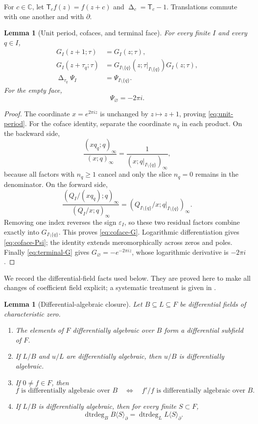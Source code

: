 \documentclass[11pt]{article}
\numberwithin{equation}{section}
\newtheorem{lemma}[theorem]{Lemma}
\theoremstyle{definition}
\theoremstyle{remark}
\newcommand{\C}{\mathbb C}
\newcommand{\dtrdeg}{\operatorname{dtrdeg}}
\newcommand{\T}{\mathsf T}
\newcommand{\Deltaop}{\mathop{\Delta}}
\begin{document}
For $c\in\C$, let $\T_cf(z)=f(z+c)$ and
$\Deltaop_c=\T_c-1$.  Translations commute with one another and with
$\partial$.

\begin{lemma}[Unit period, cofaces, and terminal face]
\label{lem:coface}
For every finite $I$ and every $q\in I$,
\begin{align}
 G_I(z+1;\tau)&=G_I(z;\tau),
 \label{eq:unit-period}\\
 G_I(z+\tau_q;\tau)&=
 G_{I\setminus\{q\}}(z;\tau|_{I\setminus\{q\}})G_I(z;\tau),
 \label{eq:coface-G}\\
 \Deltaop_{\tau_q}\Psi_I&=\Psi_{I\setminus\{q\}}.
 \label{eq:coface-Psi}
\end{align}
For the empty face,
\begin{equation}
 \Psi_\varnothing=-2\pi i.
 \label{eq:terminal-Psi}
\end{equation}
\end{lemma}

\begin{proof}
The coordinate $x=e^{2\pi iz}$ is unchanged by $z\mapsto z+1$, proving
\eqref{eq:unit-period}.  For the coface identity, separate the coordinate
$n_q$ in each product.  On the backward side,
\[
 \frac{(xq_q;q)_\infty}{(x;q)_\infty}
 =\frac{1}{(x;q|_{I\setminus\{q\}})_\infty},
\]
because all factors with $n_q\geq1$ cancel and only the slice $n_q=0$
remains in the denominator.  On the forward side,
\[
 \frac{(Q_I/(xq_q);q)_\infty}{(Q_I/x;q)_\infty}
 =(Q_{I\setminus\{q\}}/x;
 q|_{I\setminus\{q\}})_\infty.
\]
Removing one index reverses the sign $\varepsilon_I$, so these two residual
factors combine exactly into $G_{I\setminus\{q\}}$.  This proves
\eqref{eq:coface-G}.  Logarithmic differentiation gives
\eqref{eq:coface-Psi}; the identity extends meromorphically across zeros and
poles.  Finally \eqref{eq:terminal-G} gives
$G_\varnothing=-e^{-2\pi iz}$, whose logarithmic derivative is
$-2\pi i$.
\end{proof}

We record the differential-field facts used below.  They are proved here to
make all changes of coefficient field explicit; a systematic treatment is
given in \cite[Chapter~II]{Kolchin1973}.

\begin{lemma}[Differential-algebraic closure]
\label{lem:DA-closure}
Let $B\subseteq L\subseteq F$ be differential fields of characteristic zero.
\begin{enumerate}[label=\textup{(\roman*)}]
\item The elements of $F$ differentially algebraic over $B$ form a
differential subfield of $F$.
\item If $L/B$ and $u/L$ are differentially algebraic, then $u/B$ is
differentially algebraic.
\item If $0\neq f\in F$, then
\[
 f\text{ is differentially algebraic over }B
 \quad\Longleftrightarrow\quad
 f'/f\text{ is differentially algebraic over }B.
\]
\item If $L/B$ is differentially algebraic, then for every finite
$S\subset F$,
\[
 \dtrdeg_B B\langle S\rangle_\partial
 =\dtrdeg_L L\langle S\rangle_\partial.
\]
\end{enumerate}
\end{lemma}
\end{document}
